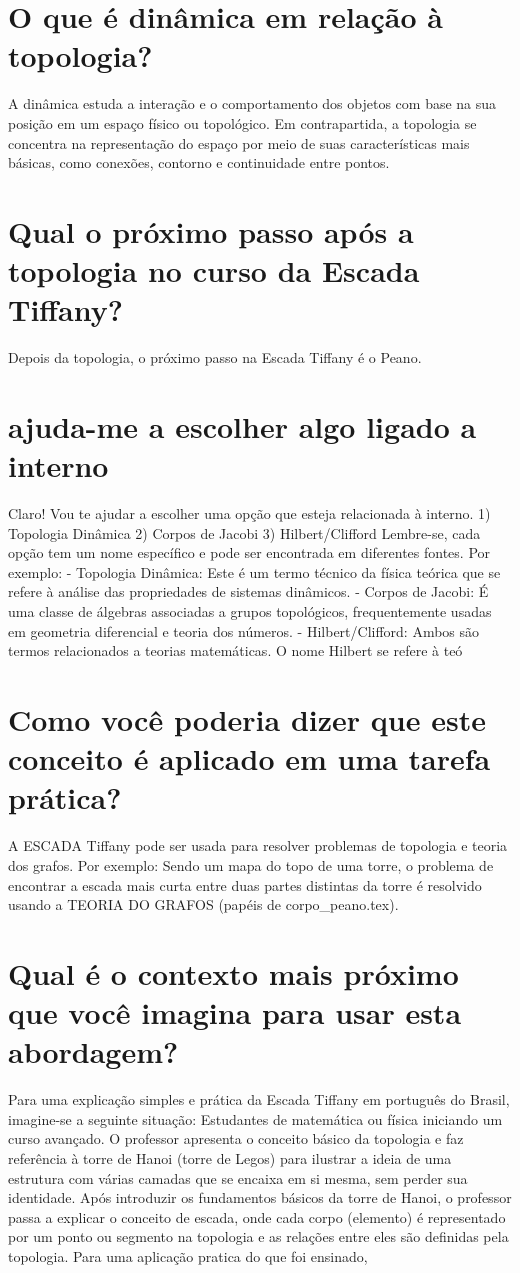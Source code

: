 \documentclass[11pt,a4paper]{article}
\begin{document}
\section{O que é dinâmica em relação à topologia?}
A dinâmica estuda a interação e o comportamento dos objetos com base na sua posição em um espaço físico ou topológico. Em contrapartida, a topologia se concentra na representação do espaço por meio de suas características mais básicas, como conexões, contorno e continuidade entre pontos.

\section{Qual o próximo passo após a topologia no curso da Escada Tiffany?}
Depois da topologia, o próximo passo na Escada Tiffany é o Peano.

\section{ajuda-me a escolher algo ligado a interno}
Claro! Vou te ajudar a escolher uma opção que esteja relacionada à interno. 1) Topologia Dinâmica 2) Corpos de Jacobi 3) Hilbert/Clifford Lembre-se, cada opção tem um nome específico e pode ser encontrada em diferentes fontes. Por exemplo: - Topologia Dinâmica: Este é um termo técnico da física teórica que se refere à análise das propriedades de sistemas dinâmicos. - Corpos de Jacobi: É uma classe de álgebras associadas a grupos topológicos, frequentemente usadas em geometria diferencial e teoria dos números. - Hilbert/Clifford: Ambos são termos relacionados a teorias matemáticas. O nome Hilbert se refere à teó

\section{Como você poderia dizer que este conceito é aplicado em uma tarefa prática?}
A ESCADA Tiffany pode ser usada para resolver problemas de topologia e teoria dos grafos. Por exemplo: Sendo um mapa do topo de uma torre, o problema de encontrar a escada mais curta entre duas partes distintas da torre é resolvido usando a TEORIA DO GRAFOS (papéis de corpo\_peano.tex).

\section{Qual é o contexto mais próximo que você imagina para usar esta abordagem?}
Para uma explicação simples e prática da Escada Tiffany em português do Brasil, imagine-se a seguinte situação: Estudantes de matemática ou física iniciando um curso avançado. O professor apresenta o conceito básico da topologia e faz referência à torre de Hanoi (torre de Legos) para ilustrar a ideia de uma estrutura com várias camadas que se encaixa em si mesma, sem perder sua identidade. Após introduzir os fundamentos básicos da torre de Hanoi, o professor passa a explicar o conceito de escada, onde cada corpo (elemento) é representado por um ponto ou segmento na topologia e as relações entre eles são definidas pela topologia. Para uma aplicação pratica do que foi ensinado,
\end{document}

